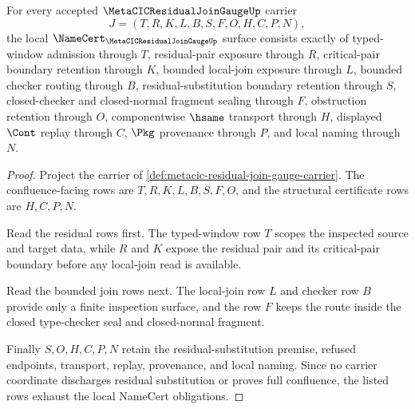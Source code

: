 \begin{theorem}
\label{thm:metacic-residual-join-gauge-namecert-obligations}
For every accepted $\MetaCICResidualJoinGaugeUp$ carrier
$$
J=(T,R,K,L,B,S,F,O,H,C,P,N),
$$
the local $\NameCert_{\MetaCICResidualJoinGaugeUp}$ surface consists exactly of typed-window admission through $T$, residual-pair exposure through $R$, critical-pair boundary retention through $K$, bounded local-join exposure through $L$, bounded checker routing through $B$, residual-substitution boundary retention through $S$, closed-checker and closed-normal fragment sealing through $F$, obstruction retention through $O$, componentwise $\hsame$ transport through $H$, displayed $\Cont$ replay through $C$, $\Pkg$ provenance through $P$, and local naming through $N$.
\end{theorem}
\begin{proof}
Project the carrier of \autoref{def:metacic-residual-join-gauge-carrier}. The confluence-facing rows are $T,R,K,L,B,S,F,O$, and the structural certificate rows are $H,C,P,N$.

Read the residual rows first. The typed-window row $T$ scopes the inspected source and target data, while $R$ and $K$ expose the residual pair and its critical-pair boundary before any local-join read is available.

Read the bounded join rows next. The local-join row $L$ and checker row $B$ provide only a finite inspection surface, and the row $F$ keeps the route inside the closed type-checker seal and closed-normal fragment.

Finally $S,O,H,C,P,N$ retain the residual-substitution premise, refused endpoints, transport, replay, provenance, and local naming. Since no carrier coordinate discharges residual substitution or proves full confluence, the listed rows exhaust the local NameCert obligations.
\end{proof}

